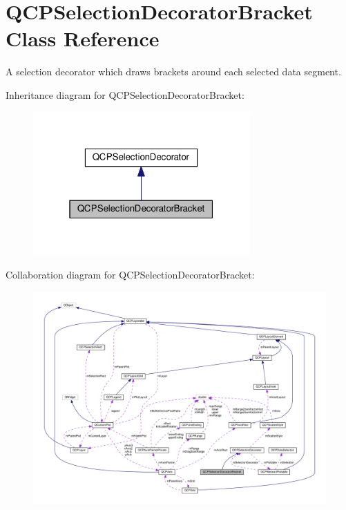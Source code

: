 \hypertarget{classQCPSelectionDecoratorBracket}{}\section{Q\+C\+P\+Selection\+Decorator\+Bracket Class Reference}
\label{classQCPSelectionDecoratorBracket}


A selection decorator which draws brackets around each selected data segment.  




Inheritance diagram for Q\+C\+P\+Selection\+Decorator\+Bracket\+:
\nopagebreak
\begin{figure}[H]
\begin{center}
\leavevmode
\includegraphics[width=235pt]{classQCPSelectionDecoratorBracket__inherit__graph}
\end{center}
\end{figure}


Collaboration diagram for Q\+C\+P\+Selection\+Decorator\+Bracket\+:
\nopagebreak
\begin{figure}[H]
\begin{center}
\leavevmode
\includegraphics[width=350pt]{classQCPSelectionDecoratorBracket__coll__graph}
\end{center}
\end{figure}
